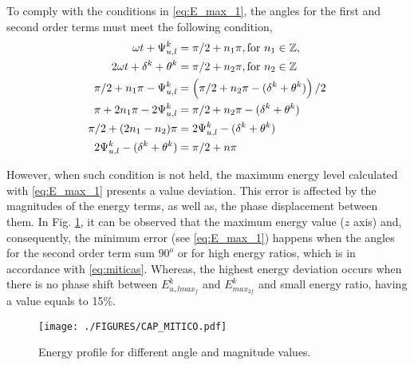 \documentclass[journal]{IEEEtran}
\begin{document}
To comply with the conditions in \eqref{eq:E_max_1}, the angles for the first and second order terms must meet the following condition, 
~
\begin{subequations}
\begin{align}
\centering
\omega t + \Psi_{u,l}^k &= \pi/2 + n_1 \pi, \text{for } n_1 \in \mathbb{Z},  \\
2 \omega t + \delta^k + \theta^k &= \pi/2 + n_2 \pi, \text{for } n_2 \in \mathbb{Z} \\
\pi/2 + n_1 \pi -\Psi_{u,l}^k &=  \left(  \pi/2 + n_2 \pi - (\delta^k + \theta^k) \right) /2 \\
\pi + 2 n_1 \pi -2 \Psi_{u,l}^k &=   \pi/2 + n_2 \pi - (\delta^k + \theta^k) \\
\pi/2 + (2 n_1-n_2) \pi &= 2 \Psi_{u,l}^k-( \delta^k + \theta^k) \\
  2 \Psi_{u,l}^k - (\delta^k + \theta^k)  &= \pi/2 + n \pi 
\end{align}
\label{eq:miticas}
\end{subequations}

However, when such condition is not held, the maximum energy level calculated with \eqref{eq:E_max_1} presents a value deviation. This error is affected by the magnitudes of the energy terms, as well as, the phase displacement between them. In Fig. \ref{fig:Cap_mitico}, it can be observed that the maximum energy value ($z$ axis) and, consequently, the minimum error (see \eqref{eq:E_max_1}) happens when the angles for the second order term sum $90^o$ or for high energy ratios, which is in accordance with \eqref{eq:miticas}. Whereas, the highest energy deviation occurs when there is no phase shift between $E_{u,lmax_{f}}^k$ and $E_{max_{2f}}^k$ and small energy ratio, having a value equals to 15\%. 


\begin{figure}[!h]
\centerline{\texttt{[image: ./FIGURES/CAP\_MITICO.pdf]}}
\caption{Energy profile for different angle and magnitude values.}
\label{fig:Cap_mitico}
\end{figure}


\end{document}
